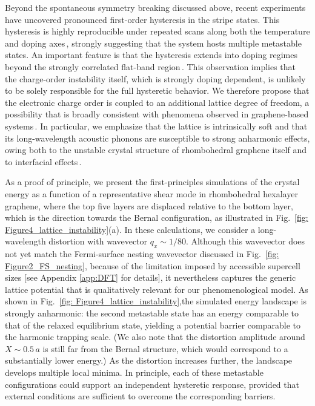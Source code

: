 \documentclass[aps,prx,article,twocolumn,amsmath,amssymb,superscriptaddress,longbibliography]{revtex4-2}
\begin{document}
Beyond the spontaneous symmetry breaking discussed above, recent experiments have uncovered pronounced first-order hysteresis in the stripe states. This hysteresis is highly reproducible under repeated scans along both the temperature and doping axes\,\cite{qin2025extreme, zhao2026hysteretical}, strongly suggesting that the system hosts multiple metastable states. An important feature is that the hysteresis extends into doping regimes beyond the strongly correlated flat-band region\,\cite{zhao2026hysteretical}. This observation implies that the charge-order instability itself, which is strongly doping dependent, is unlikely to be solely responsible for the full hysteretic behavior. We therefore propose that the electronic charge order is coupled to an additional lattice degree of freedom, a possibility that is broadly consistent with phenomena observed in graphene-based systems\,\cite{chen2024strong}. In particular, we emphasize that the lattice is intrinsically soft and that its long-wavelength acoustic phonons are susceptible to strong anharmonic effects, owing both to the unstable crystal structure of rhombohedral graphene itself and to interfacial effects\,\cite{singh2025stacking}. 

As a proof of principle, we present the first-principles simulations of the crystal energy as a function of a representative shear mode in rhombohedral hexalayer graphene, where the top five layers are displaced relative to the bottom layer, which is the direction towards the Bernal configuration, as illustrated in Fig.~\ref{fig: Figure4_lattice_instability}(a). In these calculations, we consider a long-wavelength distortion with wavevector $q_x\sim 1/80$. Although this wavevector does not yet match the Fermi-surface nesting wavevector discussed in Fig.~\ref{fig: Figure2_FS_nesting}, because of the limitation imposed by accessible supercell sizes [see Appendix \ref{app:DFT} for details], it nevertheless captures the generic lattice potential that is qualitatively relevant for our phenomenological model. As shown in Fig.~\ref{fig: Figure4_lattice_instability},the simulated energy landscape is strongly anharmonic: the second metastable state has an energy comparable to that of the relaxed equilibrium state, yielding a potential barrier comparable to the harmonic trapping scale. (We also note that the distortion amplitude around $X \sim 0.5\,a$ is still far from the Bernal structure, which would correspond to a substantially lower energy.) As the distortion increases further, the landscape develops multiple local minima. In principle, each of these metastable configurations could support an independent hysteretic response, provided that external conditions are sufficient to overcome the corresponding barriers. 
\end{document}
